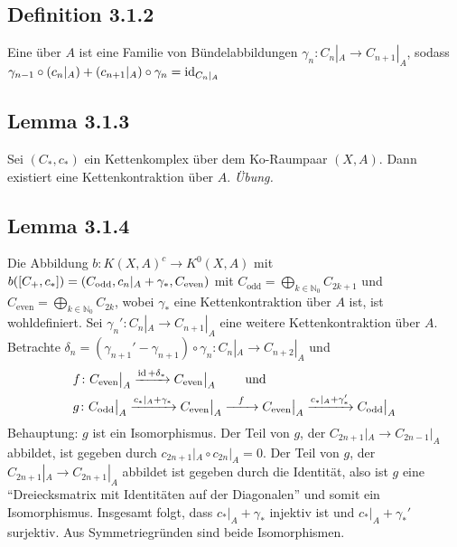 \subsection{Definition 3.1.2} %
\label{sub:def_312}
Eine  über $A$ ist eine Familie von Bündelabbildungen $\gamma_n \colon C_n|_A \to C_{n+1}|_{A}$, sodass 
$\gamma_{n-1} \circ (c_n|_A) + (c_{n+1}|_A) \circ \gamma_n = \id_{C_n|_A}$ 

\subsection{Lemma 3.1.3} %
\label{sub:lemma_3_1_3}
Sei $(C_*,c_*)$ ein Kettenkomplex über dem Ko-Raumpaar $(X,A)$. Dann existiert eine Kettenkontraktion über $A$.
\emph{Übung.}

\subsection{Lemma 3.1.4} %
\label{sub:lemma_3_1_4}
Die Abbildung $b \colon K(X,A)^c \to K^0(X,A)$ mit $b([C_+,c_*]) = \enbrace*{C_{\mathrm{odd}}, c_n|_A + \gamma_*, C_{\mathrm{even}}}$ mit 
$C_{\mathrm{odd}} = \bigoplus_{k \in \mathds{N}_0} C_{2k+1}$ und $C_{\mathrm{even}} = \bigoplus_{k \in \mathds{N}_0} C_{2k}$, wobei $\gamma_*$ eine Kettenkontraktion über 
$A$ ist, ist wohldefiniert.
Sei $\gamma_n' \colon C_n|_A \to C_{n+1}|_A$ eine weitere Kettenkontraktion über $A$. Betrachte 
$\delta_n = (\gamma_{n+1}' - \gamma_{n+1}) \circ \gamma_n \colon C_n|_A \to C_{n+2}|_A$ und
\begin{align*}
	&f \colon C_{\mathrm{even}}\big|_A \xrightarrow{\id + \delta_*} C_{\mathrm{even}}\big|_A \qquad  \text{ und} \\
	& g  \colon C_{\mathrm{odd}}\big|_A \xrightarrow{c_*|_A + \gamma_*} C_{\mathrm{even}}\big|_A \xrightarrow{\minwidthbox{f}{2em}} C_{\mathrm{even}}\big|_A \xrightarrow{c_*|_A + \gamma_*'}
	C_{\mathrm{odd}}\big|_A    
\end{align*}
Behauptung: $g$ ist ein Isomorphismus.
Der Teil von $g$, der $C_{2n+1}|_A \to C_{2n-1}|_A$ abbildet, ist gegeben durch $c_{2n+1}|_A \circ c_{2n}|_A=0$. Der Teil von $g$, der $C_{2n+1}|_A \to C_{2n+1}|_A$ abbildet 
ist gegeben durch die Identität, also ist $g$ eine \enquote{Dreiecksmatrix mit Identitäten auf der Diagonalen} und somit ein Isomorphismus. Insgesamt folgt, dass
$c_*|_A + \gamma_*$ injektiv ist und $c_*|_A + \gamma_*'$ surjektiv. Aus Symmetriegründen sind beide Isomorphismen.

